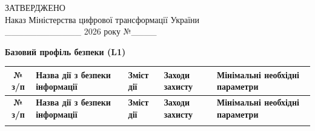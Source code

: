 \documentclass[10pt]{article}
\begin{document}
\begin{flushright}
ЗАТВЕРДЖЕНО\\
Наказ Міністерства цифрової трансформації України\\
\_\_\_\_\_\_\_\_\_\_\_\_ 2026 року №\_\_\_\_
\end{flushright}

\begin{center}
\textbf{\large Базовий профіль безпеки (L1)}
\end{center}

\footnotesize
\begin{longtable}{|c|>{\raggedright\arraybackslash}p{2.5cm}|>{\raggedright\arraybackslash}p{4cm}|>{\raggedright\arraybackslash}p{3.5cm}|>{\raggedright\arraybackslash}p{5.5cm}|}
\hline
\textbf{№ з/п} & \textbf{Назва дії з безпеки інформації} & \textbf{Зміст дії} & \textbf{Заходи захисту} & \textbf{Мінімальні необхідні параметри}\\
\hline
\endfirsthead

\hline
\textbf{№ з/п} & \textbf{Назва дії з безпеки інформації} & \textbf{Зміст дії} & \textbf{Заходи захисту} & \textbf{Мінімальні необхідні параметри}\\
\hline
\endhead

\hline
\endfoot

\hline
\endlastfoot


\end{longtable}
\end{document}
